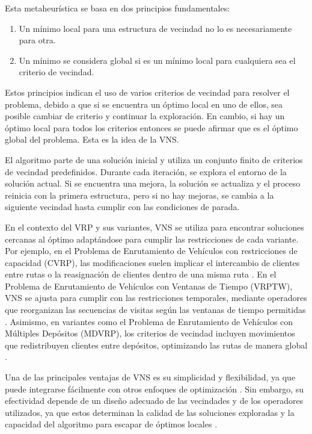 \documentclass[12pt]{report}
\begin{document}
	Esta metaheurística se basa en dos principios fundamentales:
	\begin{enumerate}
		\item
		Un mínimo local para una estructura de vecindad no lo es necesariamente para otra.
		\item
		Un mínimo se considera global si es un mínimo local para cualquiera sea el criterio de vecindad.
	\end{enumerate}

	Estos principios indican el uso de varios criterios de vecindad para resolver el problema, debido a que si se encuentra un óptimo local en uno de ellos, sea posible cambiar de criterio y continuar la exploración. En cambio, si hay un óptimo local para todos los criterios entonces se puede afirmar que es el óptimo global del problema. Esta es la idea de la VNS.

	El algoritmo parte de una solución inicial y utiliza un conjunto finito de criterios de vecindad predefinidos. Durante cada iteración, se explora el entorno de la solución actual. Si se encuentra una mejora, la solución se actualiza y el proceso reinicia con la primera estructura, pero si no hay mejoras, se cambia a la siguiente vecindad hasta cumplir con las condiciones de parada.

	En el contexto del VRP y sus variantes, VNS se utiliza para encontrar soluciones cercanas al óptimo \cite{ref14,ref15} adaptándose para cumplir las restricciones de cada variante. Por ejemplo, en el Problema de Enrutamiento de Vehículos con restricciones de capacidad (CVRP), las modificaciones suelen implicar el intercambio de clientes entre rutas o la reasignación de clientes dentro de una misma ruta \cite{ref19}. En el Problema de Enrutamiento de Vehículos con Ventanas de Tiempo (VRPTW), VNS se ajusta para cumplir con las restricciones temporales, mediante operadores que reorganizan las secuencias de visitas según las ventanas de tiempo permitidas \cite{ref16}. Asimismo, en variantes como el Problema de Enrutamiento de Vehículos con Múltiples Depósitos (MDVRP), los criterios de vecindad incluyen movimientos que redistribuyen clientes entre depósitos, optimizando las rutas de manera global \cite{ref17}.

	Una de las principales ventajas de VNS es su simplicidad y flexibilidad, ya que puede integrarse fácilmente con otros enfoques de optimización \cite{ref15}. Sin embargo, su efectividad depende de un diseño adecuado de las vecindades y de los operadores utilizados, ya que estos determinan la calidad de las soluciones exploradas y la capacidad del algoritmo para escapar de óptimos locales \cite{ref18}.
\end{document}
